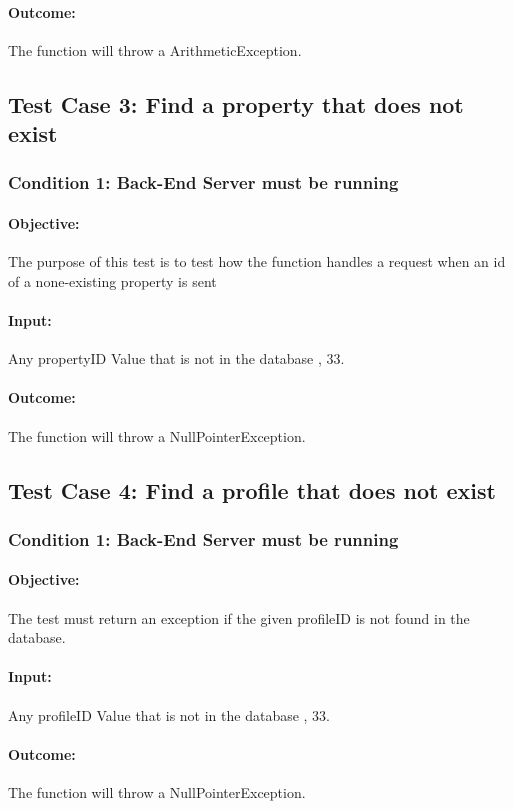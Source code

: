 \documentclass[a4paper,12pt]{article}
\begin{document}
\paragraph{Outcome: } The function will throw a ArithmeticException.

\subsection{Test Case 3: Find a property that does not exist}
\subsubsection{Condition 1: Back-End Server must be running}
\paragraph{Objective:}The purpose of this test is to test how the function handles a request when an id of a none-existing property is sent
\paragraph{Input:} Any propertyID Value that is not in the database , 33.
\paragraph{Outcome: } The function will throw a NullPointerException.

\subsection{Test Case 4: Find a profile that does not exist}
\subsubsection{Condition 1: Back-End Server must be running}
\paragraph{Objective:}The test must return an exception if the given profileID is not found in the database.
\paragraph{Input:} Any profileID Value that is not in the database , 33.
\paragraph{Outcome: } The function will throw a NullPointerException.
\end{document}

